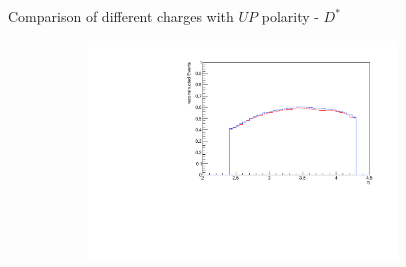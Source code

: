 \documentclass[11pt]{beamer}
\begin{document}
\begin{frame}{Comparison of different charges with $UP$ polarity - $D^*$}
\begin{figure}
\begin{subfigure}{0.45\textwidth}
\end{subfigure}
\begin{subfigure}{0.45\textwidth}
\includegraphics[width=0.9\textwidth]{up_pdf/combined/h_eta_reco_Dst.pdf}
\end{subfigure}
\end{figure}
\end{frame}
\end{document}
